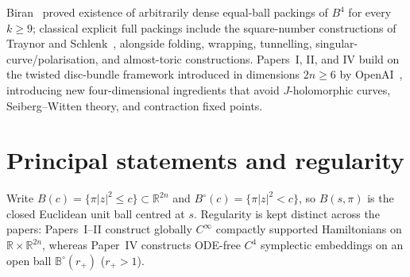 \documentclass[11pt]{amsart}
\newcommand{\R}{\mathbb{R}}
\newcommand{\Bo}{B^{\circ}}
\newcommand{\EB}{\mathbb{B}}
\begin{document}
Biran~\cite{Biran1997} proved existence of arbitrarily dense equal-ball packings of $B^4$ for every $k\ge9$; classical
explicit full packings include the square-number constructions of Traynor and Schlenk~\cite{Traynor1995,Schlenk2005},
alongside folding, wrapping, tunnelling, singular-curve/polarisation, and almost-toric constructions. Papers~I, II, and
IV build on the twisted disc-bundle framework introduced in dimensions $2n\ge6$ by OpenAI~\cite{OpenAI2026}, introducing
new four-dimensional ingredients that avoid $J$-holomorphic curves, Seiberg--Witten theory, and contraction fixed
points.

\section{Principal statements and regularity}\label{sec:statements}

Write $B(c)=\{\pi|z|^2\le c\}\subset\R^{2n}$ and $\Bo(c)=\{\pi|z|^2<c\}$, so $B(s,\pi)$ is the closed Euclidean unit ball
centred at $s$. Regularity is kept distinct across the papers: Papers~I--II construct globally $C^\infty$ compactly
supported Hamiltonians on $\R\times\R^{2n}$, whereas Paper~IV constructs ODE-free $C^4$ symplectic embeddings on an open
ball $\EB^{\circ}(r_+)$ ($r_+>1$).
\end{document}
